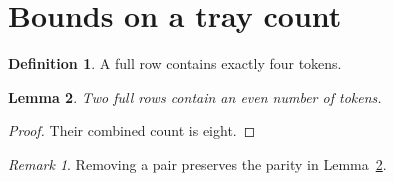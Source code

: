 \documentclass{article}
\theoremstyle{definition}\newtheorem{definition}{Definition}
\theoremstyle{plain}\newtheorem{lemma}[definition]{Lemma}
\theoremstyle{remark}\newtheorem*{remark}{Remark}\renewcommand{\proofname}{Verification}
\begin{document}
\section*{Bounds on a tray count}

\begin{definition}A full row contains exactly four tokens.\end{definition}
\begin{lemma}\label{lem}Two full rows contain an even number of tokens.\end{lemma}
\begin{proof}Their combined count is eight.\end{proof}
\begin{remark}Removing a pair preserves the parity in Lemma~\ref{lem}.\end{remark}
\end{document}
